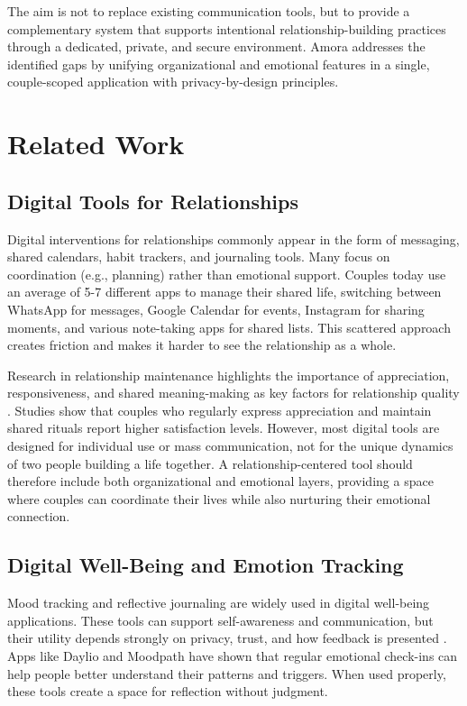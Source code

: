 \documentclass[sigconf, authorversion, nonacm, margin=0.75in]{acmart}
\begin{document}
The aim is not to replace existing communication tools, but to provide a complementary system that supports intentional relationship-building practices through a dedicated, private, and secure environment. Amora addresses the identified gaps by unifying organizational and emotional features in a single, couple-scoped application with privacy-by-design principles.

\section{Related Work}

\subsection{Digital Tools for Relationships}
Digital interventions for relationships commonly appear in the form of messaging, shared calendars, habit trackers, and journaling tools. Many focus on coordination (e.g., planning) rather than emotional support. Couples today use an average of 5-7 different apps to manage their shared life, switching between WhatsApp for messages, Google Calendar for events, Instagram for sharing moments, and various note-taking apps for shared lists. This scattered approach creates friction and makes it harder to see the relationship as a whole.

Research in relationship maintenance highlights the importance of appreciation, responsiveness, and shared meaning-making as key factors for relationship quality \cite{relationship_maintenance_overview}. Studies show that couples who regularly express appreciation and maintain shared rituals report higher satisfaction levels. However, most digital tools are designed for individual use or mass communication, not for the unique dynamics of two people building a life together. A relationship-centered tool should therefore include both organizational and emotional layers, providing a space where couples can coordinate their lives while also nurturing their emotional connection.

\subsection{Digital Well-Being and Emotion Tracking}
Mood tracking and reflective journaling are widely used in digital well-being applications. These tools can support self-awareness and communication, but their utility depends strongly on privacy, trust, and how feedback is presented \cite{digital_wellbeing_survey}. Apps like Daylio and Moodpath have shown that regular emotional check-ins can help people better understand their patterns and triggers. When used properly, these tools create a space for reflection without judgment.
\end{document}
